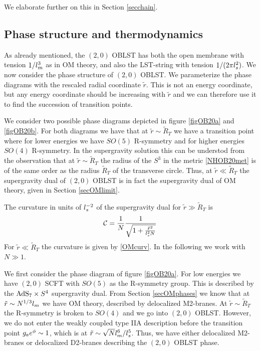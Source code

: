 \documentclass[a4paper,twoside,titlepage,12pt]{article}
\begin{document}
We elaborate further on this in Section \ref{secchain}.

\subsection{Phase structure and thermodynamics}

As already mentioned, the $(2,0)$ OBLST has both the open membrane
with tension $1/l_m^3$ as in OM theory, 
and also the LST-string with tension $1/(2\pi l_s^2)$.
We now consider the phase structure of $(2,0)$ OBLST.
We parameterize the phase diagrams with the rescaled radial
coordinate $\tilde{r}$. This is not an energy coordinate,
but any energy coordinate should be increasing with $\tilde{r}$
and we can therefore use it to find the succession 
of transition points.

We consider two possible phase diagrams depicted in figure 
\ref{figOB20a} and \ref{figOB20b}.
For both diagrams we have that at $\tilde{r} \sim \tilde{R}_T$
we have a transition point where for lower energies we have
$SO(5)$ R-symmetry and for higher energies $SO(4)$ R-symmetry.
In the supergravity solution this can be understod from
the observation that at $\tilde{r} \sim \tilde{R}_T$ the radius
of the $S^3$ in the metric \eqref{NHOB20met} is of the same
order as the radius $\tilde{R}_T$ of the transverse circle.
Thus, at $\tilde{r} \ll \tilde{R}_T$ the supergravity dual of $(2,0)$
OBLST is in fact the supergravity dual of OM theory, given in
Section \ref{secOMlimit}.

The curvature in units of $l_s^{-2}$ 
of the supergravity dual for $\tilde{r} \gg \tilde{R}_T$ is
%
\begin{equation}
\mathcal{C} = \frac{1}{N} \frac{1}{\sqrt{1+ \frac{\tilde{r}^2}{l_s^2 N}}}
\end{equation}
%
For $\tilde{r} \ll \tilde{R}_T$ the curvature is given by \eqref{OMcurv}.
In the following we work with $N \gg 1$.

We first consider the phase diagram of figure \ref{figOB20a}.
For low energies we have $(2,0)$ SCFT with $SO(5)$ as the R-symmetry
group. This is described by the ${\rm AdS}_7 \times S^4$ supergravity dual.
From Section \ref{secOMphases} we know that at $\tilde{r} \sim N^{1/3} l_m$
we have OM theory, described by delocalized M2-branes.
At $\tilde{r} \sim \tilde{R}_T$ 
the R-symmetry is broken to $SO(4)$ and we go into $(2,0)$ OBLST.
However, we do not enter the weakly coupled type IIA description
before the transition point $g_a e^{\phi} \sim 1$,
which is at $\tilde{r} \sim \sqrt{N} l_m^6 / l_s^5$.
Thus, we have either delocalized M2-branes or delocalized D2-branes
describing the $(2,0)$ OBLST phase.
\end{document}
